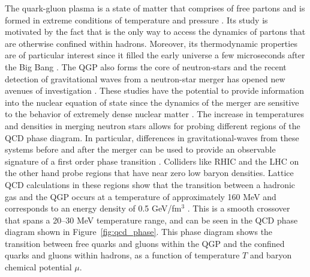 The quark-gluon plasma is a state of matter that comprises of free partons and is formed in extreme conditions of temperature and pressure \cite{SHURYAK198071}.
Its study is motivated by the fact that is the only way to access the dynamics of partons that are otherwise confined within hadrons.
Moreover, its thermodynamic properties are of particular interest since it filled the early universe a few microseconds after the Big Bang \cite{PhysRevLett.34.1353}.
The QGP also forms the core of neutron-stars \cite{Linde_1979} and the recent detection of gravitational waves from a neutron-star merger \cite{PhysRevLett.119.161101} has opened new avenues of investigation \cite{Han:2018mtj, PhysRevD.99.023009, PhysRevLett.122.061101}.
These studies have the potential to provide information into the nuclear equation of state since the dynamics of the merger are sensitive to the behavior of extremely dense nuclear matter \cite{PhysRevD.86.063001}.
The increase in temperatures and densities in merging neutron stars allows for probing different regions of the QCD phase diagram.
In particular, differences in gravitational-waves from these systems before and after the merger can be used to provide an observable signature of a first order phase transition \cite{PhysRevLett.122.061102}.
Colliders like RHIC and the LHC on the other hand probe regions that have near zero low baryon densities.
Lattice QCD calculations in these regions show that the transition between a hadronic gas and the QGP occurs at a temperature of approximately 160 MeV and corresponds to an energy density of 0.5 GeV/fm$^3$ \cite{Borsanyi:2010bp}.
This is a smooth crossover that spans a 20--30 MeV temperature range, and can be seen in the QCD phase diagram shown in Figure~\ref{fig:qcd_phase}.
This phase diagram shows the transition between free quarks and gluons within the QGP and the confined quarks and gluons within hadrons, as a function of temperature $T$ and baryon chemical potential $\mu$.


